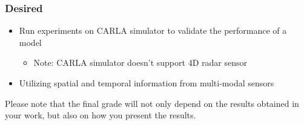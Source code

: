 \documentclass[rnd]{mas_proposal}
\begin{document}
\subsubsection*{Desired}
\begin{itemize}
    \item Run experiments on CARLA simulator to validate the performance of a model
    \begin{itemize}
        \item Note: CARLA simulator doesn't support 4D radar sensor
    \end{itemize}
    \item Utilizing spatial and temporal information from multi-modal sensors
    

\end{itemize}

Please note that the final grade will not only depend on the results obtained in your work, but also on how you present the results.

\nocite{*}

\end{document}
